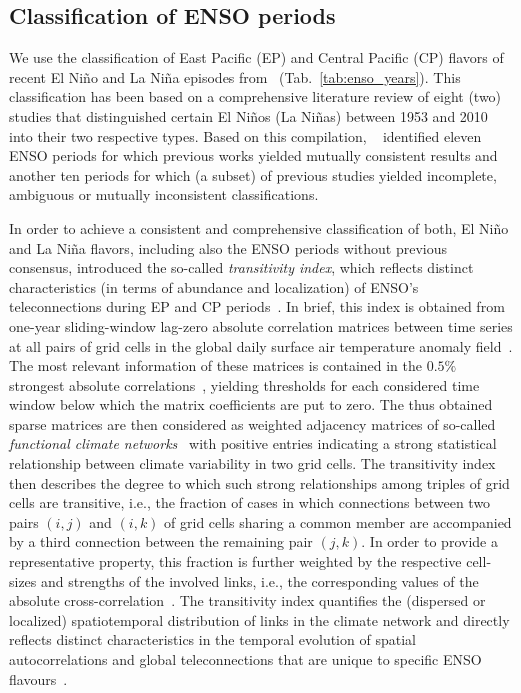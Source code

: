 \documentclass[utf8]{frontiersSCNS} %
\begin{document}
\subsection{Classification of ENSO periods}
We use the classification of East Pacific (EP) and Central Pacific (CP) flavors of recent El Ni\~no and La Ni\~na episodes from~\cite{wiedermann_climate_2016} (Tab.~\ref{tab:enso_years}). This classification has been based on a comprehensive literature review of eight (two) studies that distinguished certain El Ni\~nos (La Ni\~nas) between 1953 and 2010 into their two respective types. Based on this compilation, ~\cite{wiedermann_climate_2016} identified eleven ENSO periods for which previous works yielded mutually consistent results and another ten periods for which (a subset) of previous studies yielded incomplete, ambiguous or mutually inconsistent classifications. 

In order to achieve a consistent and comprehensive classification of both, El Ni\~no and La Ni\~na flavors, including also the ENSO periods without previous consensus, \cite{wiedermann_climate_2016} introduced the so-called \textit{transitivity index}, which reflects distinct characteristics (in terms of abundance and localization) of ENSO's teleconnections during EP and CP periods~\citep{radebach_disentangling_2013, wiedermann_climate_2016}. In brief, this index is obtained from one-year sliding-window lag-zero absolute correlation matrices between time series at all pairs of grid cells in the global daily surface air temperature anomaly field~\citep{kistler_ncepncar_2001}. The most relevant information of these matrices is contained in the $0.5\%$ strongest absolute correlations~\citep{donges_complex_2009, radebach_disentangling_2013, wiedermann_climate_2016}, yielding thresholds for each considered time window below which the matrix coefficients are put to zero. The thus obtained sparse matrices are then considered as weighted adjacency matrices of so-called {\em functional climate networks}~\citep{donges_complex_2009, wiedermann_climate_2016, radebach_disentangling_2013} with positive entries indicating a strong statistical relationship between climate variability in two grid cells. The transitivity index \citep{newman_structure_2003, antoniou_statistical_2008} then describes the degree to which such strong relationships among triples of grid cells are transitive, i.e., the fraction of cases in which connections between two pairs $(i,j)$ and $(i,k)$ of grid cells sharing a common member are accompanied by a third connection between the remaining pair $(j,k)$. In order to provide a representative property, this fraction is further weighted by the respective cell-sizes and strengths of the involved links, i.e., the corresponding values of the absolute cross-correlation~\citep{saramaki_generalizations_2007}. The transitivity index quantifies the (dispersed or localized) spatiotemporal distribution of links in the climate network and directly reflects distinct characteristics in the temporal evolution of spatial autocorrelations and global teleconnections that are unique to specific ENSO flavours~\citep{radebach_disentangling_2013, wiedermann_climate_2016}.
\end{document}
